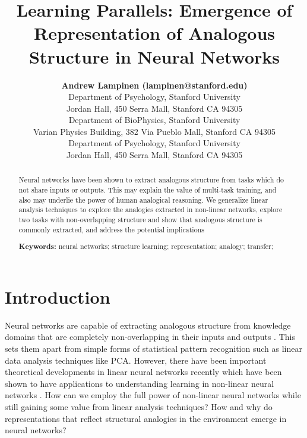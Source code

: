 \documentclass[10pt,letterpaper]{article}
\title{Learning Parallels: Emergence of Representation of Analogous Structure in Neural Networks}
\author{{\large \bf Andrew Lampinen (lampinen@stanford.edu)} \\
  Department of Psychology, Stanford University \\
  Jordan Hall, 450 Serra Mall, Stanford CA 94305 
  \AND {\large \bf Shaw Hsu (cshawhsu@stanford.edu)} \\
  Department of BioPhysics, Stanford University \\
  Varian Physics Building, 382 Via Pueblo Mall, Stanford CA 94305
  \AND {\large \bf James L. McClelland (mcclelland@stanford.edu)} \\
  Department of Psychology, Stanford University \\
  Jordan Hall, 450 Serra Mall, Stanford CA 94305}
\begin{document}
\maketitle


\begin{abstract}
Neural networks have been shown to extract analogous structure from tasks which do not share inputs or outputs. This may explain the value of multi-task training, and also may underlie the power of human analogical reasoning. We generalize linear analysis techniques to explore the analogies extracted in non-linear networks, explore two tasks with non-overlapping structure and show that analogous structure is commonly extracted, and address the potential implications 

\textbf{Keywords:} 
neural networks; structure learning; representation; analogy; transfer; 
\end{abstract}


\section{Introduction}
Neural networks are capable of extracting analogous structure from knowledge domains that are completely non-overlapping in their inputs and outputs \citep{Hinton1986,Rogers2008}. This sets them apart from simple forms of statistical pattern recognition \citep{Rogers2008} such as linear data analysis techniques like PCA. However, there have been important theoretical developments in linear neural networks recently which have been shown to have applications to understanding learning in non-linear neural networks \citep{Saxe2013}. How can we employ the full power of non-linear neural networks while still gaining some value from linear analysis techniques? How and why do representations that reflect structural analogies in the environment emerge in neural networks? \par 
\end{document}
